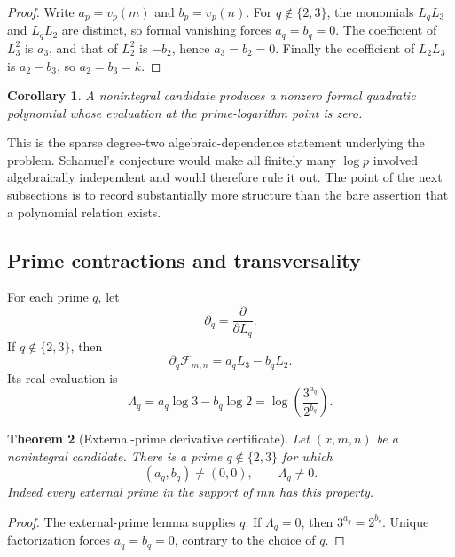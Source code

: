 \documentclass[11pt,oneside]{article}
\newtheorem{theorem}{Theorem}[section]
\newtheorem{corollary}[theorem]{Corollary}
\theoremstyle{definition}
\begin{document}
\begin{proof}
Write $a_p=v_p(m)$ and $b_p=v_p(n)$.  For $q\notin\{2,3\}$, the monomials $L_qL_3$ and $L_qL_2$ are distinct, so formal vanishing forces $a_q=b_q=0$.  The coefficient of $L_3^2$ is $a_3$, and that of $L_2^2$ is $-b_2$, hence $a_3=b_2=0$.  Finally the coefficient of $L_2L_3$ is $a_2-b_3$, so $a_2=b_3=k$.
\end{proof}

\begin{corollary}
A nonintegral candidate produces a nonzero formal quadratic polynomial whose evaluation at the prime-logarithm point is zero.
\end{corollary}

This is the sparse degree-two algebraic-dependence statement underlying the problem.  Schanuel's conjecture would make all finitely many $\log p$ involved algebraically independent and would therefore rule it out.  The point of the next subsections is to record substantially more structure than the bare assertion that a polynomial relation exists.

\subsection{Prime contractions and transversality}

For each prime $q$, let
\[
  \partial_q=\frac{\partial}{\partial L_q}.
\]
If $q\notin\{2,3\}$, then
\begin{equation}\label{eq:externalderivative}
  \partial_q\mathcal F_{m,n}=a_qL_3-b_qL_2.
\end{equation}
Its real evaluation is
\begin{equation}\label{eq:Lambdaq}
 \Lambda_q
 =a_q\log3-b_q\log2
 =\log\!\left(\frac{3^{a_q}}{2^{b_q}}\right).
\end{equation}

\begin{theorem}[External-prime derivative certificate]\label{thm:derivativecertificate}
Let $(x,m,n)$ be a nonintegral candidate.  There is a prime $q\notin\{2,3\}$ for which
\[
 (a_q,b_q)\ne(0,0),
 \qquad
 \Lambda_q\ne0.
\]
Indeed every external prime in the support of $mn$ has this property.
\end{theorem}

\begin{proof}
The external-prime lemma supplies $q$.  If $\Lambda_q=0$, then $3^{a_q}=2^{b_q}$.  Unique factorization forces $a_q=b_q=0$, contrary to the choice of $q$.
\end{proof}
\end{document}
